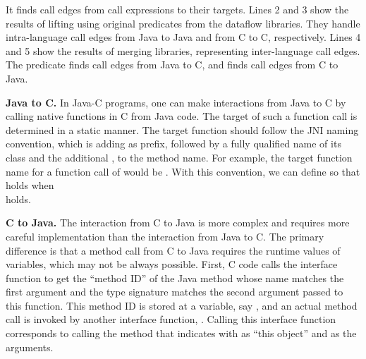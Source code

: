 \noindent
It finds call edges from call expressions to their targets.  Lines 2 and 3 show
the results of lifting using original predicates from the dataflow libraries.
They handle intra-language call edges from Java to Java and from C to C,
respectively.  Lines 4 and 5 show the results of merging libraries,
representing inter-language call edges.  The predicate
 finds call edges from Java to C, and
 finds call edges from C to Java.

\textbf{Java to C.} In Java-C programs, one can make interactions from Java to
C by calling native functions in C from Java code.  The target of such a
function call is determined in a static manner.  The target function should
follow the JNI naming convention, which is adding  as prefix,
followed by a fully qualified name of its class and the additional \codeql{\_},
to the method name.  For example, the target function name for a function call
of  would be
.  With this convention,
we can define  so that  holds when  \\ 
holds.

\textbf{C to Java.} The interaction from C to Java is more complex and requires
more careful implementation than the interaction from Java to C.  The primary
difference is that a method call from C to Java requires the runtime values of
variables, which may not be always possible.  First, C code calls the interface
function  to get the ``method ID'' of the Java
method whose name matches the first argument and the type signature matches the
second argument passed to this function.  This method ID is stored at a
variable, say , and an actual method call is invoked by another
interface function, . Calling this
interface function corresponds to calling the method that  indicates
with  as ``this object'' and  as the arguments.

